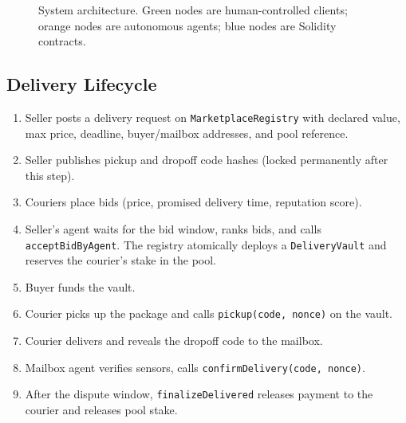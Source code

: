 \documentclass[12pt,a4paper]{article}
\begin{document}
\begin{figure}[H]
\caption{System architecture. Green nodes are human-controlled clients; orange nodes are autonomous agents; blue nodes are Solidity contracts.}
\label{fig:arch}
\end{figure}

\subsection{Delivery Lifecycle}

\begin{enumerate}
    \item Seller posts a delivery request on \texttt{MarketplaceRegistry} with declared value, max price, deadline, buyer/mailbox addresses, and pool reference.
    \item Seller publishes pickup and dropoff code hashes (locked permanently after this step).
    \item Couriers place bids (price, promised delivery time, reputation score).
    \item Seller's agent waits for the bid window, ranks bids, and calls \texttt{acceptBidByAgent}. The registry atomically deploys a \texttt{DeliveryVault} and reserves the courier's stake in the pool.
    \item Buyer funds the vault.
    \item Courier picks up the package and calls \texttt{pickup(code, nonce)} on the vault.
    \item Courier delivers and reveals the dropoff code to the mailbox.
    \item Mailbox agent verifies sensors, calls \texttt{confirmDelivery(code, nonce)}.
    \item After the dispute window, \texttt{finalizeDelivered} releases payment to the courier and releases pool stake.
\end{enumerate}
\end{document}
